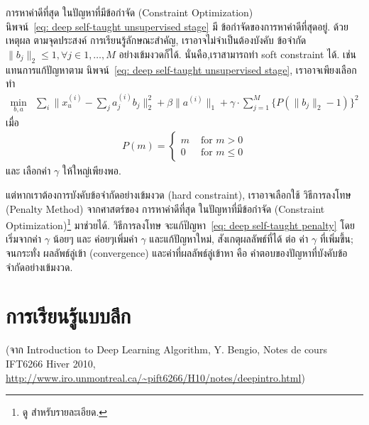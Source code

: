 \begin{minipage}{5.5in}
{\small
\begin{shaded}
การหาค่าดีที่สุด ในปัญหาที่มีข้อกำจัด (Constraint Optimization)
\\
นิพจน์~\ref{eq: deep self-taught unsupervised stage} มี ข้อกำจัดของการหาค่าดีที่สุดอยู่.
ด้วยเหตุผล ตามจุดประสงค์ การเรียนรู้ลักษณะสำคัญ, เราอาจไม่จำเป็นต้องบังคับ ข้อจำกัด
$\| b_j \|_2 \leq 1, \forall j \in 1, \ldots, M$ อย่างเข้มงวดก็ได้. นั่นคือ,เราสามารถทำ soft constraint ได้.
เช่น แทนการแก้ปัญหาตาม นิพจน์~\ref{eq: deep self-taught unsupervised stage}, เราอาจเพียงเลือกทำ
\begin{eqnarray}
  \min_{b,a} & \sum_i \| x_u^{(i)} - \sum_j a_j^{(i)} b_j \|_2^2 + \beta \| a^{(i)} \|_1
  + \gamma \cdot \sum_{j=1}^M \{ P(\| b_j \|_2 - 1) \}^2
\label{eq: deep self-taught penalty}  
\end{eqnarray} 
เมื่อ
\begin{eqnarray}
P(m) = \left\{\begin{matrix}
m & \mbox{ for } m > 0 \\
0   & \mbox{ for } m \leq 0
\end{matrix} \right.
\nonumber
\end{eqnarray}
และ เลือกค่า $\gamma$ ให้ใหญ่เพียงพอ.

แต่หากเราต้องการบังคับข้อจำกัดอย่างเข้มงวด (hard constraint), เราอาจเลือกใช้ วิธีการลงโทษ (Penalty Method)  จากศาสตร์ของ การหาค่าดีที่สุด ในปัญหาที่มีข้อกำจัด (Constraint Optimization)\footnote{
ดู \cite{ChongZak2ndEd} สำหรับรายละเอียด.}
มาช่วยได้.
วิธีการลงโทษ จะแก้ปัญหา~\ref{eq: deep self-taught penalty} โดยเริ่มจากค่า $\gamma$ น้อยๆ และ ค่อยๆเพิ่มค่า $\gamma$ และแก้ปัญหาใหม่, สังเกตุผลลัพธ์ที่ได้ ต่อ ค่า $\gamma$ ที่เพิ่มขึ้น;
จนกระทั่ง ผลลัพธ์ลู่เข้า (convergence) และค่าที่ผลลัพธ์ลู่เข้าหา คือ คำตอบของปัญหาที่บังคับข้อจำกัดอย่างเข้มงวด.
\end{shaded}
}
\end{minipage}

\section{การเรียนรู้แบบลึก}
\label{deep learning: deep learning}

(จาก Introduction to Deep Learning Algorithm, Y. Bengio, Notes de cours IFT6266 Hiver 2010, \url{http://www.iro.unmontreal.ca/~pift6266/H10/notes/deepintro.html})

